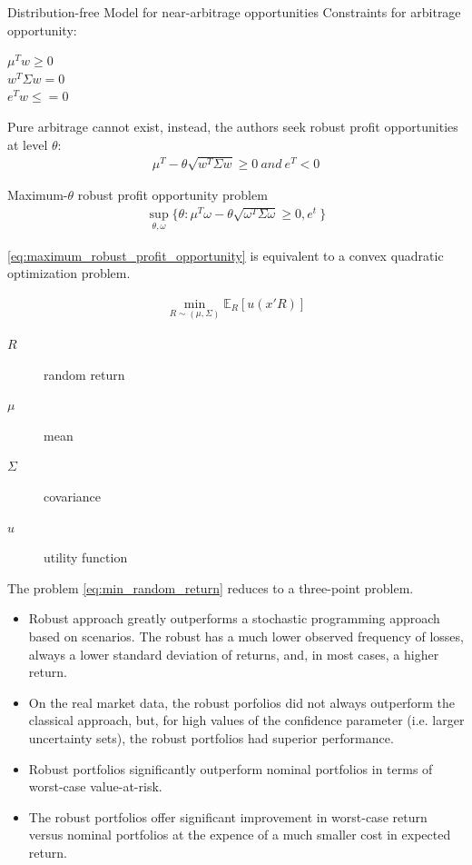 \documentclass{beamer}
\begin{document}
\begin{frame}{Distribution-free Model for near-arbitrage opportunities}
Constraints for arbitrage opportunity:
\begin{description}
\item [$\mu^{T}w \geq 0$]
\item  [$w^{T}\Sigma w = 0$]
\item [$e^{T} w \leq = 0$]
\end{description}

Pure arbitrage cannot exist, instead, the authors seek robust profit opportunities at level $\theta$:
\begin{align*}
\mu^{T} - \theta\sqrt{w^T\Sigma w} \geq 0~and~e^T < 0
\end{align*}

Maximum-$\theta$ robust profit opportunity problem
\begin{align}
\label{eq:maximum_robust_profit_opportunity}
\sup_{\theta,\omega} \{ \theta: \mu^{T}\omega - \theta\sqrt{\omega^{T}\Sigma \omega} \geq 0, e^{t}\ \}
\end{align}

\ref{eq:maximum_robust_profit_opportunity} is equivalent to a convex quadratic optimization problem.

\begin{align}
\label{eq:min_random_return}
\min_{R \sim (\mu,\Sigma)} \mathbb{E}_{R} [u(x'R)]
\end{align}
\begin{description}
\item [$R$] random return
\item [$\mu$] mean
\item [$\Sigma$] covariance
\item [$u$] utility function
\end{description}
The problem \ref{eq:min_random_return} reduces to a three-point problem.
\end{frame}

\begin{frame}{}
\begin{itemize}
\item Robust approach greatly outperforms a stochastic programming approach based on scenarios. The robust has a much lower observed frequency of losses, always a lower standard deviation of returns, and, in most cases, a higher return.
\item On the real market data, the robust porfolios did not always outperform the classical approach, but, for high values of the confidence parameter (i.e. larger uncertainty sets), the robust portfolios had superior performance.
\item Robust portfolios significantly outperform nominal portfolios in terms of worst-case value-at-risk.
\item The robust portfolios offer significant improvement in worst-case return versus nominal portfolios at the expence of a much smaller cost in expected return.
\end{itemize}
\end{frame}
\end{document}
